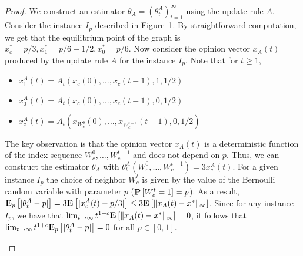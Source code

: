 \begin{proof}
  We construct an estimator $\theta_A = (\theta^A_t)_{t=1}^\infty$
  using the update rule $A$. Consider the instance $I_p$ described in
  Figure~\ref{fig:lb_instance}.
  By straightforward computation, we get that the equilibrium point of
  the graph is $x_c^* = p/3, x_1^* = p/6+1/2, x_0^* = p/6$.
  Now consider the opinion vector $x_A(t)$ produced by the update
  rule $A$ for the instance $I_p$. Note that for $t \geq 1$,
  \begin{itemize}
   \item  $x_1^A(t)=A_t(x_c(0),\ldots,x_c(t-1),1,1/2)$
   \item  $x_0^A(t)=A_t(x_c(0),\ldots,x_c(t-1),0,1/2)$
   \item  $x_c^A(t)=A_t(x_{W_c^0}(0),\ldots,x_{W_c^{t-1}}(t-1),0,1/2)$
  \end{itemize}
  The key observation is that the opinion vector $x_A(t)$ is a deterministic function
  of the index sequence $W_c^0,\ldots,W_c^{t-1}$ and does not depend on $p$. Thus,
  we can construct the estimator $\theta_A$ with
  $\theta_t^A(W_c^0,\ldots,W_c^{t-1}) = 3x_c^A(t)$.
  For a given instance $I_p$ the choice of neighbor $W_c^t$ is given by the value of
  the Bernoulli random variable with parameter $p$ ($\bm{\mathrm{P}}\left[W_c^t=1\right]=p$). As a result,
  $\bm{\mathrm{E}}_{p} \left[ |\theta_t^A-p| \right]=
  3\bm{\mathrm{E}}_{} \left[ |x_c^A(t)-p/3| \right]\leq 3\bm{\mathrm{E}}_{} \left[ \| x_A(t)-x^* \|_{\infty} \right]$.
  Since for any instance $I_p$, we have that
  $\lim_{t \rightarrow \infty} t^{1+c}\bm{\mathrm{E}}_{} \left[ \| x_A(t)-x^* \|_{\infty} \right]=0$,
  it follows that $\lim_{t \rightarrow \infty}t^{1+c}\bm{\mathrm{E}}_{p} \left[ |\theta_t^A -p| \right]=0$
  for all $p \in [0,1]$.
  \vspace{-5mm}
  \begin{figure}
    \centering
    \vspace{-12mm}
     \caption{}
    \label{fig:lb_instance}
    \vspace{-8mm}
  \end{figure}
\end{proof}
